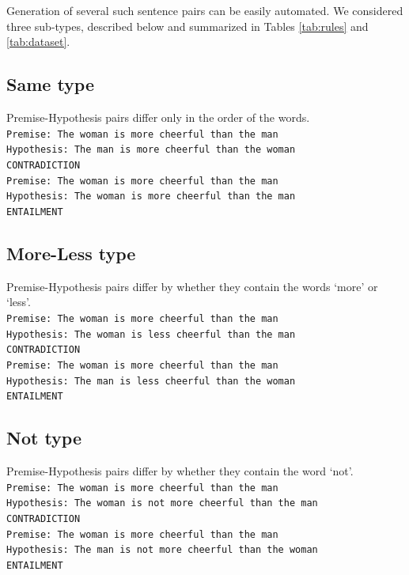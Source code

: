 Generation of several such sentence pairs can be easily automated. We considered three sub-types, described below and summarized in Tables \ref{tab:rules} and \ref{tab:dataset}.
 
\subsection{Same type}
Premise-Hypothesis pairs differ only in the order of the words. \\
{\tt Premise: The woman is more cheerful than the man \\ Hypothesis: The man is more cheerful than the woman \\ CONTRADICTION \\} {\tt Premise: The woman is more cheerful than the man \\ Hypothesis: The woman is more cheerful than the man\\ ENTAILMENT}

\subsection{More-Less type}
Premise-Hypothesis pairs differ by whether they contain the words `more' or `less'. \\
{\tt Premise: The woman is more cheerful than the man \\ Hypothesis: The woman is less cheerful than the man\\ CONTRADICTION \\}{\tt Premise: The woman is more cheerful than the man \\ Hypothesis: The man is less cheerful than the woman \\ ENTAILMENT} 

\subsection{Not type}
Premise-Hypothesis pairs differ by whether they contain the word `not'. \\
{\tt Premise: The woman is more cheerful than the man \\ Hypothesis: The woman is not more cheerful than the man\\ CONTRADICTION \\}{\tt Premise: The woman is more cheerful than the man \\ Hypothesis: The man is not more cheerful than the woman \\ ENTAILMENT} 


